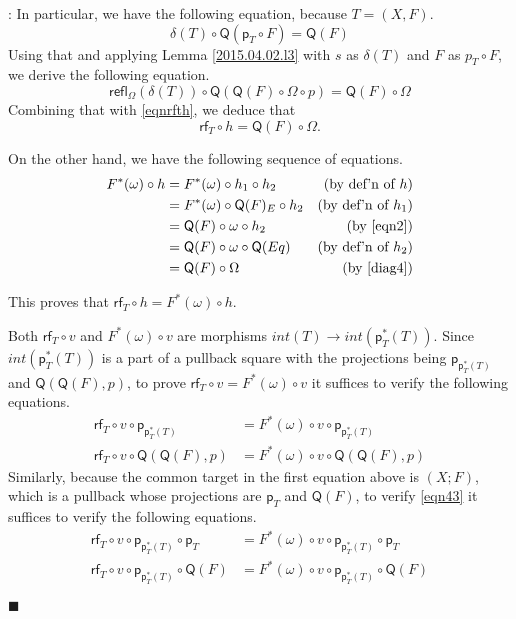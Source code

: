 \documentclass[12pt]{article}
\numberwithin{equation}{section}
\newenvironment{myproof}{{\bf Proof}:}{$\blacksquare$ \vskip 5mm }
\newcommand{\by}[1]{\text{(by #1)}}
\newcommand{\sr}{\rightarrow}
\newcommand{\p}{\mathsf{p}}
\newcommand{\refl}{\mathsf{refl}}
\newcommand{\rf}{\mathsf{rf}}
\newcommand{\Q}{\mathsf{Q}}
\begin{document}
\begin{myproof}
In particular, we have the following equation, because $T = (X,F)$.
\[
  \delta(T) \circ \Q(\p_T \circ F) = \Q(F)
\]
Using that and applying Lemma \ref{2015.04.02.l3} with $s$ as $\delta(T)$ and $F$ as $p_T \circ F$,
we derive the following equation.
%
\[
  \refl_\Omega(\delta(T))\circ \Q(\Q(F)\circ \Omega\circ p)=\Q(F)\circ \Omega
\]
Combining that with \ref{eqnrfth}, we deduce that 
\[
  \rf_T \circ h = \Q(F)\circ \Omega.
\]

On the other hand, we have the following sequence of equations.
\begin{align*}
  F^*(\omega) \circ h & = F^*(\omega) \circ h_1 \circ h_2    & \by{def'n of $h$} \\
                      & = F^*(\omega) \circ \Q(F)_E \circ h_2 & \by{def'n of $h_1$} \\
                      & = \Q(F) \circ \omega \circ h_2       & \by{\ref{eqn2}} \\
                      & = \Q(F) \circ \omega \circ \Q(Eq)    & \by{def'n of $h_2$} \\
                      & = \Q(F) \circ \Omega                 & \by{\ref{diag4}}
\end{align*}

This proves that $\rf_T\circ h=F^*(\omega)\circ h$.


Both $\rf_T\circ v$ and $F^*(\omega)\circ v$ are morphisms
$int(T)\sr int(\p_T^*(T))$. Since $int(\p_T^*(T))$ is a part of a pullback square with the
projections being $\p_{\p_T^*(T)}$ and $\Q(\Q(F), p)$, to prove
$\rf_T\circ v = F^*(\omega)\circ v$ it suffices to verify the following equations.
\begin{align}
  \rf_T\circ v \circ \p_{\p_T^*(T)}   & = F^*(\omega)\circ v \circ \p_{\p_T^*(T)}   \label{eqn43}  \\
  \rf_T\circ v \circ \Q(\Q(F), p) & = F^*(\omega)\circ v \circ \Q(\Q(F), p) \label{eqn44}
\end{align}
Similarly, because the common target in the first equation above is $(X;F)$,
which is a pullback whose projections are $\p_T$ and $\Q(F)$, to verify \ref{eqn43} it suffices to
verify the following equations.
\begin{align}
  \rf_T\circ v \circ \p_{\p_T^*(T)} \circ \p_T   & = F^*(\omega)\circ v \circ \p_{\p_T^*(T)} \circ \p_T      \label{eqn45}  \\
  \rf_T\circ v \circ \p_{\p_T^*(T)} \circ \Q(F)  & = F^*(\omega)\circ v \circ \p_{\p_T^*(T)} \circ \Q(F)     \label{eqn46}  
\end{align}


\end{myproof}
\end{document}

